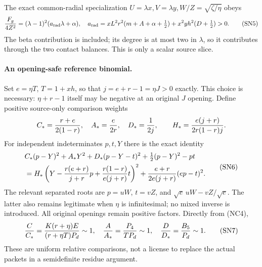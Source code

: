 The exact common-radial specialization
$U=\lambda x,V=\lambda y,W/Z=\sqrt{\zeta/\eta}$ obeys
\[
 \frac{F_g}{4Z^2}=(\lambda-1)^2(a_{\rm rad}\lambda+\alpha),
 \quad a_{\rm rad}=xL^2r^2(m+A+\alpha+\tfrac12)
                   +x^2yh^2(D+\tfrac12)>0.              \tag{SN5}
\]
The beta contribution is included; its degree is at most two in
$\lambda$, so it contributes through the two contact balances.
This is only a scalar source slice.

\paragraph{An opening-safe reference binomial.}
Set $e=\eta T$, $T=1+xh$, so that $j=e+r-1=\eta J>0$ exactly.
This choice is necessary: $\eta+r-1$ itself may be negative at an
original $J$ opening. Define positive source-only comparison weights
\[
 C_*={r+e\over2(1-r)},\quad A_*={e\over2r},\quad
 D_*={1\over2j},\qquad
 H_*={e(j+r)\over2r(1-r)j}.
\]
For independent indeterminates $p,t,Y$ there is the exact identity
\[
\begin{split}
 &C_*(p-Y)^2+A_*Y^2+D_*(p-Y-t)^2
                +\tfrac12(p-Y)^2-pt\\
 &=H_*\left(Y-{r(e+r)\over j+r}p
                    +{r(1-r)\over e(j+r)}t\right)^2
       +{e+r\over2e(j+r)}(ep-t)^2.                    
\end{split}\tag{SN6}
\]
The relevant separated roots are $p=uW$, $t=vZ$, and
$\sqrt e\,uW-vZ/\sqrt e$. The latter also remains legitimate
when $\eta$ is infinitesimal; no mixed inverse is introduced.
All original openings remain positive factors. Directly from (NC4),
\[
 {C\over C_*}={K(r+\eta)E\over(r+\eta T)P_d}\sim1,
 \quad {A\over A_*}={P_4\over TP_d}\sim1,
 \quad {D\over D_*}={B_5\over P_d}\sim1.                 \tag{SN7}
\]
These are uniform relative comparisons, not a license to replace
the actual packets in a semidefinite residue argument.

